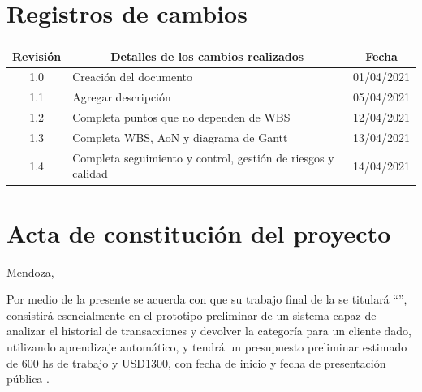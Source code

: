 \documentclass[11pt]{charter}
\begin{document}
\maketitle
\thispagestyle{empty}
\pagebreak


\thispagestyle{empty}
{\setlength{\parskip}{0pt}
\tableofcontents{}
}
\pagebreak


\section{Registros de cambios}
\label{sec:registro}


\begin{table}[ht]
\label{tab:registro}
\centering
\begin{tabularx}{\linewidth}{@{}|c|X|c|@{}}
\hline
\rowcolor[HTML]{C0C0C0} 
Revisión & \multicolumn{1}{c|}{\cellcolor[HTML]{C0C0C0}Detalles de los cambios realizados} & Fecha      \\ \hline
1.0      & Creación del documento                                          & 01/04/2021 \\ \hline
1.1      & Agregar descripción                                          & 05/04/2021 \\ \hline
1.2      & Completa puntos que no dependen de WBS                       & 12/04/2021 \\ \hline
1.3      & Completa WBS, AoN y diagrama de Gantt                        & 13/04/2021 \\ \hline
1.4      & Completa seguimiento y control, gestión de riesgos y calidad & 14/04/2021 \\ \hline
\end{tabularx}
\end{table}

\pagebreak



\section{Acta de constitución del proyecto}
\label{sec:acta}

\begin{flushright}
Mendoza, \fechaInicioName
\end{flushright}

\vspace{2cm}

Por medio de la presente se acuerda con \authorname\hspace{1px} que su trabajo final de la \degreename\hspace{1px} 
se titulará ``\ttitle'', consistirá esencialmente en el prototipo preliminar de un sistema capaz de analizar el historial de 
transacciones y devolver la categoría para un cliente dado, utilizando aprendizaje automático, y tendrá un presupuesto 
preliminar estimado de 600 hs de trabajo y USD1300, con fecha de inicio \fechaInicioName\hspace{1px} y fecha de presentación 
pública \fechaFinalName.
\end{document}
